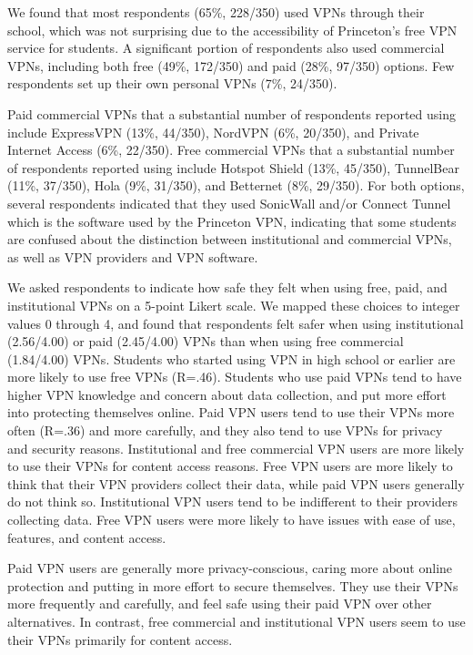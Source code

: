 We found that most respondents (65\%, 228/350) used VPNs through their school, which was not surprising due to the accessibility of Princeton’s free VPN service for students. A significant portion of respondents also used commercial VPNs, including both free (49\%, 172/350) and paid (28\%, 97/350) options. Few respondents set up their own personal VPNs (7\%, 24/350).

Paid commercial VPNs that a substantial number of respondents reported using include ExpressVPN (13\%, 44/350), NordVPN (6\%, 20/350), and Private Internet Access (6\%, 22/350). Free commercial VPNs that a substantial number of respondents reported using include Hotspot Shield (13\%, 45/350), TunnelBear (11\%, 37/350), Hola (9\%, 31/350), and Betternet (8\%, 29/350). For both options, several respondents indicated that they used SonicWall and/or Connect Tunnel which is the software used by the Princeton VPN, indicating that some students are confused about the distinction between institutional and commercial VPNs, as well as VPN providers and VPN software.

We asked respondents to indicate how safe they felt when using free, paid, and institutional VPNs on a 5-point Likert scale. We mapped these choices to integer values 0 through 4, and found that respondents felt safer when using institutional (2.56/4.00) or paid (2.45/4.00) VPNs than when using free commercial (1.84/4.00) VPNs. Students who started using VPN in high school or earlier are more likely to use free VPNs (R=.46). Students who use paid VPNs tend to have higher VPN knowledge and concern about data collection, and put more effort into protecting themselves online. Paid VPN users tend to use their VPNs more often (R=.36) and more carefully, and they also tend to use VPNs for privacy and security reasons. Institutional and free commercial VPN users are more likely to use their VPNs for content access reasons. Free VPN users are more likely to think that their VPN providers collect their data, while paid VPN users generally do not think so. Institutional VPN users tend to be indifferent to their providers collecting data. Free VPN users were more likely to have issues with ease of use, features, and content access.

Paid VPN users are generally more privacy-conscious, caring more about online protection and putting in more effort to secure themselves. They use their VPNs more frequently and carefully, and feel safe using their paid VPN over other alternatives. In contrast, free commercial and institutional VPN users seem to use their VPNs primarily for content access.


